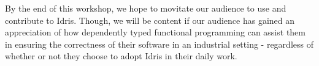 By the end of this workshop, we hope to movitate our audience to use and contribute to Idris. Though, we
will be content if our audience has gained an appreciation of how dependently typed functional programming
can assist them in ensuring the correctness of their software in an industrial setting - regardless of whether
or not they choose to adopt Idris in their daily work.
